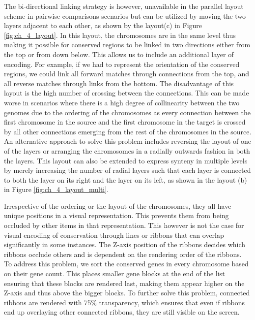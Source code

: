 The bi-directional linking strategy is however, unavailable in the parallel layout scheme in pairwise comparisons scenarios but can be utilized by moving the two layers adjacent to each other, as shown by the layout(c) in Figure \ref{fig:ch_4_layout}. In this layout,  the chromosomes are in the same level thus making it possible for conserved regions to be linked in two directions either from the top or from down below. This allows us to include an additional layer of encoding. For example, if we had to represent the orientation of the conserved regions, we could link all forward matches through connections from the top, and all reverse matches through links from the bottom. The disadvantage of this layout is the high number of crossing between the connections. This can be made worse in scenarios where there is a high degree of collinearity between the two genomes due to the ordering of the chromosomes as every connection between the first chromosome in the source and the first chromosome in the target is crossed by all other connections emerging from the rest of the chromosomes in the source. An alternative approach to solve this problem includes reversing the layout of one of the layers or arranging the chromosomes in a radially outwards fashion in both the layers. This layout can also be extended to express synteny in multiple levels by merely increasing the number of radial layers such that each layer is connected to both the layer on its right and the layer on its left, as shown in the layout (b) in Figure \ref{fig:ch_4_layout_multi}.



Irrespective of the ordering or the layout of the chromosomes, they all have unique positions in a visual representation. This prevents them from being occluded by other items in that representation. This however is not the case for  visual encoding of conservation through lines or ribbons that can overlap significantly in some instances. The Z-axis position of the ribbons decides which ribbons occlude others and is dependent on the rendering order of the ribbons. To address this problem, we sort the conserved genes in every chromosome based on their gene count. This places smaller gene blocks at the end of the list ensuring that these blocks are rendered last, making them appear higher on the Z-axis and thus above the bigger blocks. To further solve this problem, connected ribbons are rendered with 75\% transparency, which ensures that even if ribbons end up overlaying other connected ribbons, they are still visible on the screen.

